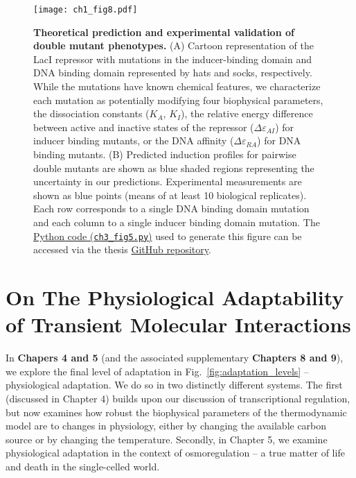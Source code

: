 \documentclass[12pt]{caltech_thesis}
\begin{document}
\hypertarget{fig:double_muts_intro}{%
\begin{figure}
\centering
\texttt{[image: ch1\_fig8.pdf]}
\caption[{Theoretical prediction and experimental validation of double
mutant phenotypes.}]{\textbf{Theoretical prediction and experimental
validation of double mutant phenotypes.} (A) Cartoon representation of
the LacI repressor with mutations in the inducer-binding domain and DNA
binding domain represented by hats and socks, respectively. While the
mutations have known chemical features, we characterize each mutation as
potentially modifying four biophysical parameters, the dissociation
constants (\(K_A\), \(K_I\)), the relative energy difference between
active and inactive states of the repressor (\(\Delta\varepsilon_{AI}\))
for inducer binding mutants, or the DNA affinity
(\(\Delta\varepsilon_{RA}\)) for DNA binding mutants. (B) Predicted
induction profiles for pairwise double mutants are shown as blue shaded
regions representing the uncertainty in our predictions. Experimental
measurements are shown as blue points (means of at least 10 biological
replicates). Each row corresponds to a single DNA binding domain
mutation and each column to a single inducer binding domain mutation.
The
\href{https://github.com/gchure/phd/blob/master/src/chapter_03/code/ch3_fig5.py}{Python
code (\texttt{ch3\_fig5.py})} used to generate this figure can be
accessed via the thesis \href{https://github.com/gchure/phd}{GitHub
repository}.}
\label{fig:double_muts_intro}
\end{figure}
}

\hypertarget{on-the-physiological-adaptability-of-transient-molecular-interactions}{%
\section{On The Physiological Adaptability of Transient Molecular
Interactions}\label{on-the-physiological-adaptability-of-transient-molecular-interactions}}

In \textbf{Chapers 4 and 5} (and the associated supplementary
\textbf{Chapters 8 and 9}), we explore the final level of adaptation in
Fig.~\ref{fig:adaptation_levels} -- physiological adaptation. We do so
in two distinctly different systems. The first (discussed in Chapter 4)
builds upon our discussion of transcriptional regulation, but now
examines how robust the biophysical parameters of the thermodynamic
model are to changes in physiology, either by changing the available
carbon source or by changing the temperature. Secondly, in Chapter 5, we
examine physiological adaptation in the context of osmoregulation -- a
true matter of life and death in the single-celled world.
\end{document}
